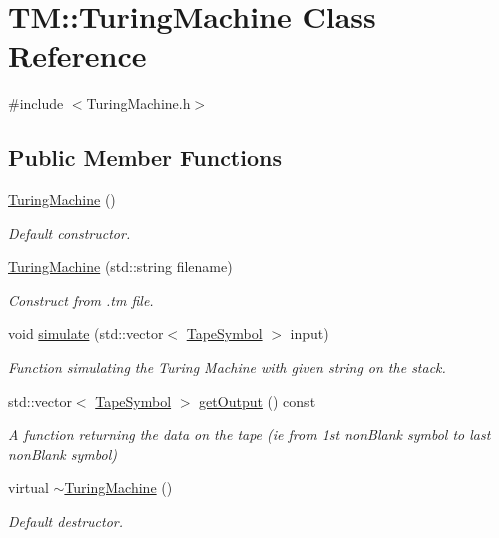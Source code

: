 \hypertarget{classTM_1_1TuringMachine}{\section{\-T\-M\-:\-:\-Turing\-Machine \-Class \-Reference}
\label{dd/d15/classTM_1_1TuringMachine}
}


{\ttfamily \#include $<$\-Turing\-Machine.\-h$>$}

\subsection*{\-Public \-Member \-Functions}
\begin{DoxyCompactItemize}
\item 
\hyperlink{classTM_1_1TuringMachine_afe0ee742405dc0279765af22666df9d3}{\-Turing\-Machine} ()
\begin{DoxyCompactList}\small\item\em \-Default constructor. \end{DoxyCompactList}\item 
\hyperlink{classTM_1_1TuringMachine_a92026a3ba4e06bfed9abf0ac2b56709a}{\-Turing\-Machine} (std\-::string filename)
\begin{DoxyCompactList}\small\item\em \-Construct from .tm file. \end{DoxyCompactList}\item 
void \hyperlink{classTM_1_1TuringMachine_a72857c5669511dcfca719ddd6422e8f8}{simulate} (std\-::vector$<$ \hyperlink{classTM_1_1TapeSymbol}{\-Tape\-Symbol} $>$ input)
\begin{DoxyCompactList}\small\item\em \-Function simulating the \-Turing \-Machine with given string on the stack. \end{DoxyCompactList}\item 
std\-::vector$<$ \hyperlink{classTM_1_1TapeSymbol}{\-Tape\-Symbol} $>$ \hyperlink{classTM_1_1TuringMachine_a83164b2cc501c122fe56808c570bab27}{get\-Output} () const 
\begin{DoxyCompactList}\small\item\em \-A function returning the data on the tape (ie from 1st non\-Blank symbol to last non\-Blank symbol) \end{DoxyCompactList}\item 
virtual \hyperlink{classTM_1_1TuringMachine_aa0d38ebf67a34efdc5e404086f936285}{$\sim$\-Turing\-Machine} ()
\begin{DoxyCompactList}\small\item\em \-Default destructor. \end{DoxyCompactList}\end{DoxyCompactItemize}
